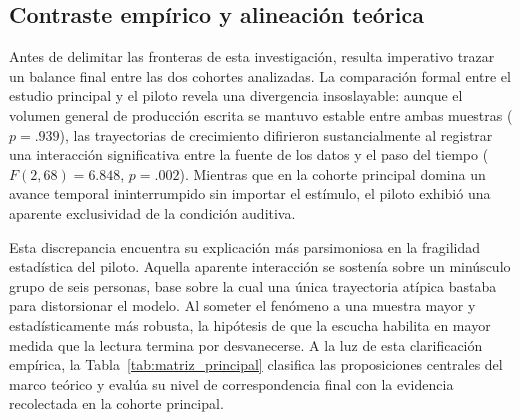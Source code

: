 \documentclass[12pt]{article}
\begin{document}
	\subsection{Contraste empírico y alineación teórica}
	
	Antes de delimitar las fronteras de esta investigación, resulta imperativo trazar un balance final entre las dos cohortes analizadas. La comparación formal entre el estudio principal y el piloto revela una divergencia insoslayable: aunque el volumen general de producción escrita se mantuvo estable entre ambas muestras ($p = .939$), las trayectorias de crecimiento difirieron sustancialmente al registrar una interacción significativa entre la fuente de los datos y el paso del tiempo ($F(2,68) = 6.848$, $p = .002$). Mientras que en la cohorte principal domina un avance temporal ininterrumpido sin importar el estímulo, el piloto exhibió una aparente exclusividad de la condición auditiva. 
	
	Esta discrepancia encuentra su explicación más parsimoniosa en la fragilidad estadística del piloto. Aquella aparente interacción se sostenía sobre un minúsculo grupo de seis personas, base sobre la cual una única trayectoria atípica bastaba para distorsionar el modelo. Al someter el fenómeno a una muestra mayor y estadísticamente más robusta, la hipótesis de que la escucha habilita en mayor medida que la lectura termina por desvanecerse. A la luz de esta clarificación empírica, la Tabla~\ref{tab:matriz_principal} clasifica las proposiciones centrales del marco teórico y evalúa su nivel de correspondencia final con la evidencia recolectada en la cohorte principal.
	
\end{document}
